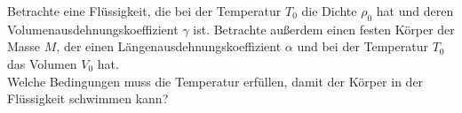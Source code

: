 \begin{Exercise}[label = Schwimmen oder nicht - das ist hier die Frage, origin = {Maximilian Marienhagen}, title = Schwimmen oder nicht - das ist hier die Frage, difficulty = 2]
Betrachte eine Flüssigkeit, die bei der Temperatur $T_0$ die Dichte $\rho_0$ hat und deren Volumenausdehnungskoeffizient $\gamma$ ist. Betrachte außerdem einen festen Körper der Masse $M$, der einen Längenausdehnungskoeffizient $\alpha$ und bei der Temperatur $T_0$ das Volumen $V_0$ hat.\\
Welche Bedingungen muss die Temperatur erfüllen, damit der Körper in der Flüssigkeit schwimmen kann?
\end{Exercise}
